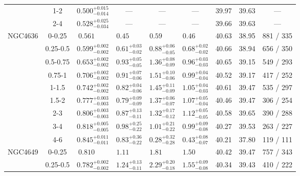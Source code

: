 \documentclass[structabstract]{aa}
\begin{document}
{{\begin{longtable}{lcccccccc}
 & 1-2 & $ 0.500 _{- 0.014 }^{+ 0.015 } $ & --- & --- & --- &  39.97 & 39.63 & --- \\
 & 2-4 & $ 0.528 _{- 0.034 }^{+ 0.025 } $ & --- & --- & --- &  39.66 & 39.63 & --- \\
\hline
NGC4636 & 0-0.25 & $ 0.561~~~~~~~~ $ & $  0.45~~~~~~~~ $ & $  0.59~~~~~~~~ $ & $  0.46~~~~~~~~ $ &  40.63 &  38.95&   881 /   335 \\
 & 0.25-0.5 & $ 0.599 _{- 0.002 }^{+ 0.002 } $ & $  0.61 _{-  0.02 }^{+  0.03 } $ & $  0.88 _{-  0.05 }^{+  0.06 } $ & $  0.68 _{-  0.02 }^{+  0.02 } $ &  40.66 & 38.94 &   656 /   350 \\
 & 0.5-0.75 & $ 0.653 _{- 0.002 }^{+ 0.002 } $ & $  0.93 _{-  0.05 }^{+  0.05 } $ & $  1.36 _{-  0.09 }^{+  0.08 } $ & $  0.96 _{-  0.03 }^{+  0.03 } $ &  40.65 & 39.15 &   549 /   293 \\
 & 0.75-1 & $ 0.706 _{- 0.002 }^{+ 0.002 } $ & $  0.91 _{-  0.06 }^{+  0.07 } $ & $  1.51 _{-  0.06 }^{+  0.10 } $ & $  0.99 _{-  0.04 }^{+  0.04 } $ &  40.52 & 39.17 &   417 /   252 \\
 & 1-1.5 & $ 0.742 _{- 0.002 }^{+ 0.002 } $ & $  0.82 _{-  0.06 }^{+  0.04 } $ & $  1.45 _{-  0.09 }^{+  0.11 } $ & $  1.05 _{-  0.03 }^{+  0.04 } $ &  40.61 & 39.47 &   535 /   297 \\
 & 1.5-2 & $ 0.777 _{- 0.003 }^{+ 0.003 } $ & $  0.79 _{-  0.09 }^{+  0.09 } $ & $  1.37 _{-  0.07 }^{+  0.06 } $ & $  1.07 _{-  0.04 }^{+  0.05 } $ &  40.46 & 39.47 &   306 /   254 \\
 & 2-3 & $ 0.806 _{- 0.003 }^{+ 0.003 } $ & $  0.87 _{-  0.11 }^{+  0.13 } $ & $  1.32 _{-  0.12 }^{+  0.17 } $ & $  1.12 _{-  0.05 }^{+  0.05 } $ &  40.58 & 39.65 &   390 /   288 \\
 & 3-4 & $ 0.818 _{- 0.005 }^{+ 0.005 } $ & $  0.98 _{-  0.22 }^{+  0.25 } $ & $  1.01 _{-  0.22 }^{+  0.21 } $ & $  0.99 _{-  0.08 }^{+  0.09 } $ &  40.27 & 39.53 &   263 /   227 \\
 & 4-6 & $ 0.845 _{- 0.011 }^{+ 0.011 } $ & $  0.83 _{-  0.22 }^{+  0.36 } $ & $  0.28 _{-  0.28 }^{+  0.32 } $ & $  0.43 _{-  0.07 }^{+  0.08 } $ &  40.21 & 37.80 &   119 /   111 \\
\hline
NGC4649 & 0-0.25 & $ 0.810~~~~~~~~ $ & $  1.11~~~~~~~~ $ & $  1.81~~~~~~~~ $ & $  1.50~~~~~~~~ $ &  40.42 & 39.47 &   757 /   343 \\
 & 0.25-0.5 & $ 0.782 _{- 0.002 }^{+ 0.002 } $ & $  1.24 _{-  0.11 }^{+  0.13 } $ & $  2.29 _{-  0.18 }^{+  0.20 } $ & $  1.55 _{-  0.08 }^{+  0.09 } $ &  40.34 & 39.43 &   410 /   222 \\

\end{longtable}}}
\end{document}
